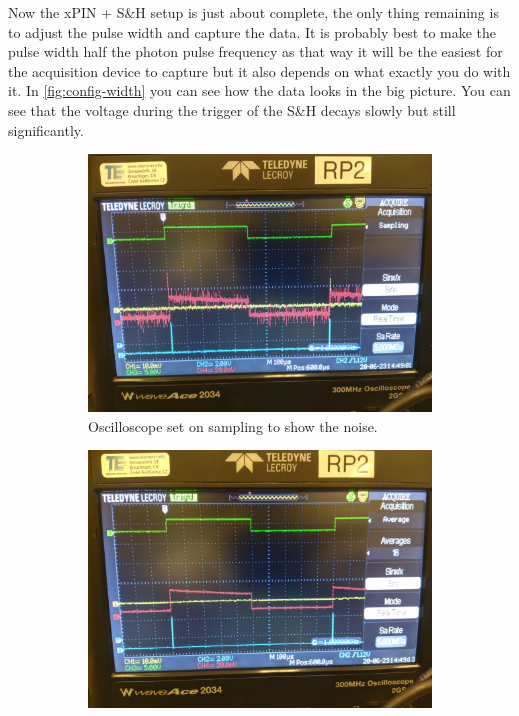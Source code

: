 \documentclass[a4paper, 10pt]{article}
\begin{document}
Now the xPIN + S\&H setup is just about complete, the only thing remaining is to adjust the pulse width and capture the data.
It is probably best to make the pulse width half the photon pulse frequency as that way it will be the easiest for the acquisition device to capture but it also depends on what exactly you do with it.
In \cref{fig:config-width} you can see how the data looks in the big picture.
You can see that the voltage during the trigger of the S\&H decays slowly but still significantly.

\begin{figure}[H]
    \centering
    \begin{subfigure}{0.45\textwidth}
        \includegraphics[width=\textwidth]{../images/config-width-sampling.jpg}
        \caption{Oscilloscope set on sampling to show the noise.}
        \label{fig:config-width-sampling}
    \end{subfigure}
    \begin{subfigure}{0.45\textwidth}
        \includegraphics[width=\textwidth]{../images/config-width-averaging.jpg}

\end{subfigure}
\end{figure}
\end{document}
